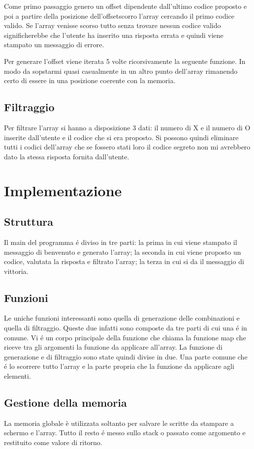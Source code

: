 \documentclass{article}
\begin{document}
Come primo passaggio genero un offset dipendente dall'ultimo codice proposto e poi a partire della posizione dell'offsetscorro l'array cercando il primo codice valido. Se l'array venisse scorso tutto senza trovare nessun codice valido significherebbe che l'utente ha inserito una risposta errata e quindi viene stampato un messaggio di errore.

Per generare l'offset viene iterata 5 volte ricorsivamente la seguente funzione. In modo da sopstarmi quasi casualmente in un altro punto dell'array rimanendo certo di essere in una posizione coerente con la memoria.

\subsection{Filtraggio}
Per filtrare l'array si hanno a disposizione 3 dati: il numero di X e il numero di O inserite dall'utente e il codice che si era proposto. Si possono quindi eliminare tutti i codici dell'array che se fossero stati loro il codice segreto non mi avrebbero dato la stessa risposta fornita dall'utente.

\section{Implementazione}
\subsection{Struttura}
Il main del programma \'e diviso in tre parti: la prima in cui viene stampato il messaggio di benvenuto e generato l'array; la seconda in cui viene proposto un codice, valutata la risposta e filtrato l'array; la terza in cui si da il messaggio di vittoria. 

\subsection{Funzioni}
Le uniche funzioni interessanti sono quella di generazione delle combinazioni e quella di filtraggio. Queste due infatti sono composte da tre parti di cui una \'e in comune. Vi \'e un corpo principale della funzione che chiama la funzione map che riceve tra gli argomenti la funzione da applicare all'array. La funzione di generazione e di filtraggio sono state quindi divise in due. Una parte comune che \'e lo scorrere tutto l'array e la parte propria che  la funzione da applicare agli elementi. 

\subsection{Gestione della memoria}
La memoria globale è utilizzata soltanto per salvare le scritte da stampare a schermo e l'array. Tutto il resto \'e messo sullo stack o passato come argomento e restituito come valore di ritorno.
\end{document}
